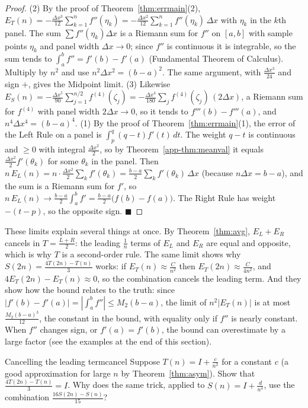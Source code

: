 \documentclass[11pt]{article}
\begin{document}
\begin{proof}
(2) By the proof of Theorem~\ref{thm:errmain}(2), $E_T(n)=-\frac{\Delta x^3}{12}\sum_{k=1}^nf''(\eta_k)=-\frac{\Delta x^2}{12}\sum_{k=1}^nf''(\eta_k)\,\Delta x$ with $\eta_k$ in the $k$th panel. The sum $\sum f''(\eta_k)\Delta x$ is a Riemann sum for $f''$ on $[a,b]$ with sample points $\eta_k$ and panel width $\Delta x\to0$; since $f''$ is continuous it is integrable, so the sum tends to $\int_a^bf''=f'(b)-f'(a)$ (Fundamental Theorem of Calculus). Multiply by $n^2$ and use $n^2\Delta x^2=(b-a)^2$. The same argument, with $\frac{\Delta x^3}{24}$ and sign $+$, gives the Midpoint limit. (3) Likewise $E_S(n)=-\frac{\Delta x^5}{90}\sum_{j=1}^{n/2}f^{(4)}(\zeta_j)=-\frac{\Delta x^4}{180}\sum_jf^{(4)}(\zeta_j)\,(2\Delta x)$, a Riemann sum for $f^{(4)}$ with panel width $2\Delta x\to0$, so it tends to $f'''(b)-f'''(a)$, and $n^4\Delta x^4=(b-a)^4$. (1) By the proof of Theorem~\ref{thm:errmain}(1), the error of the Left Rule on a panel is $\int_p^q(q-t)f'(t)\,dt$. The weight $q-t$ is continuous and $\ge0$ with integral $\frac{\Delta x^2}2$, so by Theorem~\ref{app-thm:meanval} it equals $\frac{\Delta x^2}2f'(\theta_k)$ for some $\theta_k$ in the panel. Then $n\,E_L(n)=n\cdot\frac{\Delta x^2}2\sum_kf'(\theta_k)=\frac{b-a}2\sum_kf'(\theta_k)\,\Delta x$ (because $n\Delta x=b-a$), and the sum is a Riemann sum for $f'$, so $n\,E_L(n)\to\frac{b-a}2\int_a^bf'=\frac{b-a}2\big(f(b)-f(a)\big)$. The Right Rule has weight $-(t-p)$, so the opposite sign. $\blacksquare$
\end{proof}

These limits explain several things at once. By Theorem~\ref{thm:avg}, $E_L+E_R$ cancels in $T=\frac{L+R}2$: the leading $\frac1n$ terms of $E_L$ and $E_R$ are equal and opposite, which is why $T$ is a second-order rule. The same limit shows why $S(2n)=\frac{4T(2n)-T(n)}3$ works: if $E_T(n)\approx\frac{C}{n^2}$ then $E_T(2n)\approx\frac{C}{4n^2}$, and $4E_T(2n)-E_T(n)\approx0$, so the combination cancels the leading term. And they show how the bound relates to the truth: since $\lvert f'(b)-f'(a)\rvert=\left\lvert\int_a^bf''\right\rvert\le M_2(b-a)$, the limit of $n^2\lvert E_T(n)\rvert$ is at most $\frac{M_2(b-a)^3}{12}$, the constant in the bound, with equality only if $f''$ is nearly constant. When $f''$ changes sign, or $f'(a)=f'(b)$, the bound can overestimate by a large factor (see the examples at the end of this section).

\begin{think}{Cancelling the leading term}{cancel}
Suppose $T(n)=I+\frac c{n^2}$ for a constant $c$ (a good approximation for large $n$ by Theorem~\ref{thm:asym}). Show that $\frac{4T(2n)-T(n)}3=I$. Why does the same trick, applied to $S(n)=I+\frac d{n^4}$, use the combination $\frac{16S(2n)-S(n)}{15}$?
\end{think}
\end{document}
